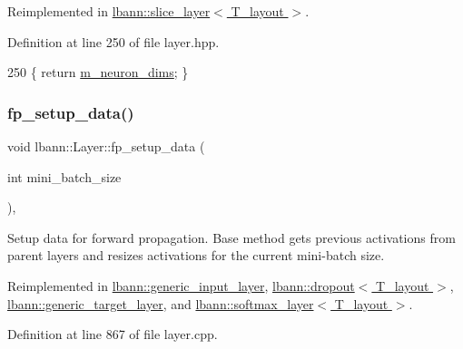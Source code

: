 Reimplemented in \hyperlink{classlbann_1_1slice__layer_a086c918fe72f28248f987d6a3aef355d}{lbann\+::slice\+\_\+layer$<$ T\+\_\+layout $>$}.



Definition at line 250 of file layer.\+hpp.


\begin{DoxyCode}
250 \{ \textcolor{keywordflow}{return} \hyperlink{classlbann_1_1Layer_abb34bb8031f57a483e2e327a5f229f48}{m\_neuron\_dims}; \}
\end{DoxyCode}
\mbox{\label{classlbann_1_1Layer_af311d901a5f71e4c749454647e9fd9c7}} 
\subsubsection{\texorpdfstring{fp\+\_\+setup\+\_\+data()}{fp\_setup\_data()}}
{\footnotesize\ttfamily void lbann\+::\+Layer\+::fp\+\_\+setup\+\_\+data (\begin{DoxyParamCaption}\item[{int}]{mini\+\_\+batch\+\_\+size }\end{DoxyParamCaption})\hspace{0.3cm}{\ttfamily [protected]}, {\ttfamily [virtual]}}

Setup data for forward propagation. Base method gets previous activations from parent layers and resizes activations for the current mini-\/batch size. 

Reimplemented in \hyperlink{classlbann_1_1generic__input__layer_ad0b8ea79bc508bd227e08124359531c8}{lbann\+::generic\+\_\+input\+\_\+layer}, \hyperlink{classlbann_1_1dropout_a478368964f515f5456324b6504a5358f}{lbann\+::dropout$<$ T\+\_\+layout $>$}, \hyperlink{classlbann_1_1generic__target__layer_af89a8227784c005354bf937ec887a7ed}{lbann\+::generic\+\_\+target\+\_\+layer}, and \hyperlink{classlbann_1_1softmax__layer_a313aa2f82acfbca8f3852378d00c22c3}{lbann\+::softmax\+\_\+layer$<$ T\+\_\+layout $>$}.



Definition at line 867 of file layer.\+cpp.



